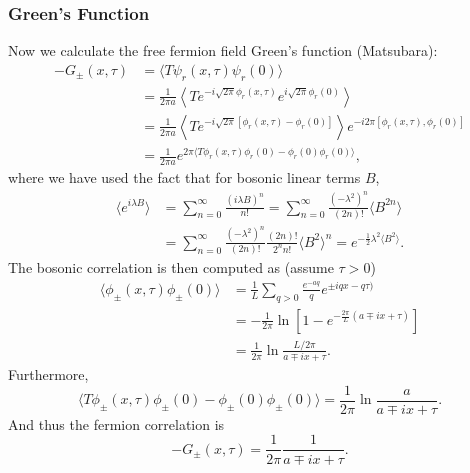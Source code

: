 \subsubsection{Green's Function}
Now we calculate the free fermion field Green's function (Matsubara):
\begin{equation}
\begin{aligned}
	-G_\pm(x,\tau) &= \langle T \psi_r(x,\tau)\psi_r(0)\rangle \\
	&= \frac{1}{2\pi a} \left\langle T e^{-i\sqrt{2\pi}\phi_r(x,\tau)} e^{i\sqrt{2\pi}\phi_r(0)} \right\rangle \\
	&= \frac{1}{2\pi a} \left\langle T e^{-i\sqrt{2\pi}[\phi_r(x,\tau)-\phi_r(0)]}\right\rangle e^{-i2\pi[\phi_r(x,\tau),\phi_r(0)]} \\
	&= \frac{1}{2\pi a} e^{2\pi\langle T \phi_r(x,\tau)\phi_r(0) - \phi_r(0)\phi_r(0)\rangle},
\end{aligned}
\end{equation}
where we have used the fact that for bosonic linear terms $B$,
\begin{equation}
\begin{aligned}
	\langle e^{i\lambda B}\rangle 
	&= \sum_{n=0}^{\infty} \frac{(i\lambda B)^n}{n!}
		= \sum_{n=0}^{\infty} \frac{(-\lambda^2)^n}{(2n)!} \langle B^{2n}\rangle \\
	&= \sum_{n=0}^{\infty} \frac{(-\lambda^2)^n}{(2n)!} \frac{(2n)!}{2^n n!}\langle B^{2}\rangle^n
	= e^{-\frac{1}{2}\lambda^2 \langle B^2\rangle}.
\end{aligned}
\end{equation}
The bosonic correlation is then computed as (assume $\tau>0$)
\begin{equation}
\begin{aligned}
	\langle \phi_\pm(x,\tau) \phi_\pm(0)\rangle 
	&= \frac{1}{L}\sum_{q>0} \frac{e^{-aq}}{q} e^{\pm iqx - q\tau)} \\
	&= -\frac{1}{2\pi} \ln\left[1-e^{-\frac{2\pi}{L}(a \mp ix + \tau)}\right] \\
	&= \frac{1}{2\pi} \ln \frac{L/2\pi}{a \mp ix + \tau}.
\end{aligned}
\end{equation}
Furthermore, 
\begin{equation}
	\langle T\phi_\pm(x,\tau) \phi_\pm(0) - \phi_\pm(0)\phi_\pm(0)\rangle 
	= \frac{1}{2\pi} \ln \frac{a}{a \mp ix + \tau}.
\end{equation}
And thus the fermion correlation is
\begin{equation}
	-G_\pm(x,\tau) = \frac{1}{2\pi} \frac{1}{a \mp i x + \tau}.
\end{equation}






